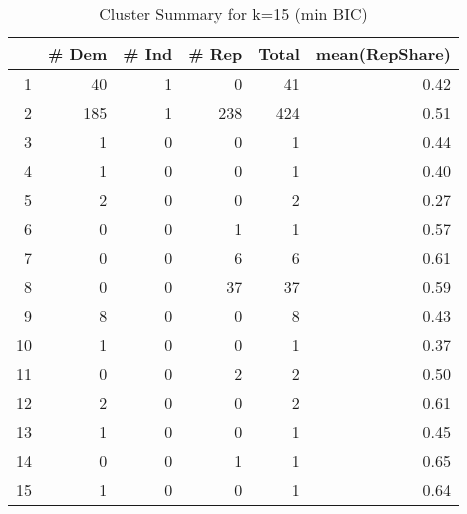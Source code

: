 \begin{table}[ht]
\centering
\begin{tabular}{rrrrrr}
  \hline
 & \# Dem & \# Ind & \# Rep & Total & mean(RepShare) \\ 
  \hline
1 &  40 &   1 &   0 &  41 & 0.42 \\ 
  2 & 185 &   1 & 238 & 424 & 0.51 \\ 
  3 &   1 &   0 &   0 &   1 & 0.44 \\ 
  4 &   1 &   0 &   0 &   1 & 0.40 \\ 
  5 &   2 &   0 &   0 &   2 & 0.27 \\ 
  6 &   0 &   0 &   1 &   1 & 0.57 \\ 
  7 &   0 &   0 &   6 &   6 & 0.61 \\ 
  8 &   0 &   0 &  37 &  37 & 0.59 \\ 
  9 &   8 &   0 &   0 &   8 & 0.43 \\ 
  10 &   1 &   0 &   0 &   1 & 0.37 \\ 
  11 &   0 &   0 &   2 &   2 & 0.50 \\ 
  12 &   2 &   0 &   0 &   2 & 0.61 \\ 
  13 &   1 &   0 &   0 &   1 & 0.45 \\ 
  14 &   0 &   0 &   1 &   1 & 0.65 \\ 
  15 &   1 &   0 &   0 &   1 & 0.64 \\ 
   \hline
\end{tabular}
\caption{Cluster Summary for k=15 (min BIC)} 
\label{tab:k_means_summary}
\end{table}
